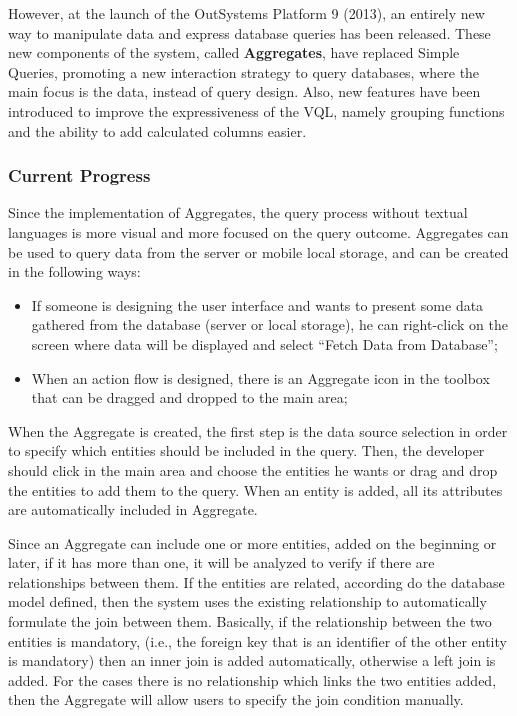 However, at the launch of the OutSystems Platform 9 (2013), an entirely new way to manipulate data and express database queries has been released. These new components of the system, called \textbf{Aggregates}, have replaced Simple Queries, promoting a new interaction strategy to query databases, where the main focus is the data, instead of query design. Also, new features have been introduced to improve the expressiveness of the \gls{VQL}, namely grouping functions and the ability to add calculated columns easier.


\subsubsection{Current Progress}
\label{subsubsec:current_progress}

Since the implementation of Aggregates, the query process without textual languages is more visual and more focused on the query outcome. Aggregates can be used to query data from the server or mobile local storage, and can be created in the following ways: 

\begin{itemize}
	\item If someone is designing the user interface and wants to present some data gathered from the database (server or local storage), he can right-click on the screen where data will be displayed and select “Fetch Data from Database”;
	\item When an action flow is designed, there is an Aggregate icon in the toolbox that can be dragged and dropped to the main area;
\end{itemize}

When the Aggregate is created, the first step is the data source selection in order to specify which entities should be included in the query. Then, the developer should click in the main area and choose the entities he wants or drag and drop the entities to add them to the query. When an entity is added, all its attributes are automatically included in Aggregate. 

Since an Aggregate can include one or more entities, added on the beginning or later, if it has more than one, it will be analyzed to verify if there are relationships between them. If the entities are related, according do the database model defined, then the system uses the existing relationship to automatically formulate the join between them. Basically, if the relationship between the two entities is mandatory, (i.e., the foreign key that is an identifier of the other entity is mandatory) then an inner join is added automatically, otherwise a left join is added. For the cases there is no relationship which links the two entities added, then the Aggregate will allow users to specify the join condition manually.

